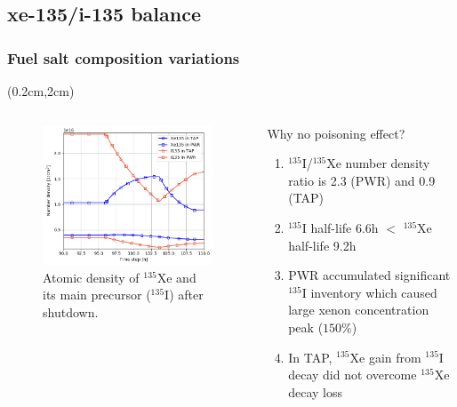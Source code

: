 \subsection{xe-135/i-135 balance}
\begin{frame}
\frametitle{Fuel salt composition variations}
\begin{textblock*}{12.5cm}(0.2cm,2cm) %
	\begin{columns}[t,onlytextwidth]
		\begin{figure}[t]
	\includegraphics[width=\linewidth]{./images/tap_vs_pwr_xe_i_density.png}
		\caption{Atomic density of $^{135}$Xe and its main precursor 
		($^{135}$I) after shutdown.}
		\end{figure}
			\vspace{+5mm}
		\begin{block}{Why no poisoning effect?}
			\begin{enumerate}             
				\item $^{135}$I/$^{135}$Xe number density ratio is 2.3 (PWR) 
				and 0.9 (TAP)
				\item $^{135}$I half-life 6.6h $<$ $^{135}$Xe half-life 9.2h
				\item PWR accumulated significant $^{135}$I inventory which 
				caused large xenon concentration  peak ($150\%$)
				\item In TAP, $^{135}$Xe gain from $^{135}$I decay did
				not overcome $^{135}$Xe decay loss
			\end{enumerate}
		\end{block}
	\end{columns}
\end{textblock*}
\end{frame}

